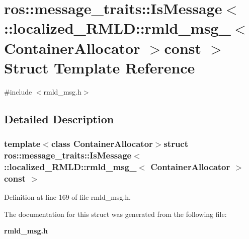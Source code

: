\section{ros::message\_\-traits::IsMessage$<$ ::localized\_\-RMLD::rmld\_\-msg\_\-$<$ ContainerAllocator $>$const $>$ Struct Template Reference}
\label{structros_1_1message__traits_1_1IsMessage_3_01_1_1localized__RMLD_1_1rmld__msg___3_01ContainerAllocator_01_4const_01_01_4}


{\ttfamily \#include $<$rmld\_\-msg.h$>$}



\subsection{Detailed Description}
\subsubsection*{template$<$class ContainerAllocator$>$struct ros::message\_\-traits::IsMessage$<$ ::localized\_\-RMLD::rmld\_\-msg\_\-$<$ ContainerAllocator $>$const  $>$}



Definition at line 169 of file rmld\_\-msg.h.



The documentation for this struct was generated from the following file:\begin{DoxyCompactItemize}
\item 
{\bf rmld\_\-msg.h}\end{DoxyCompactItemize}
